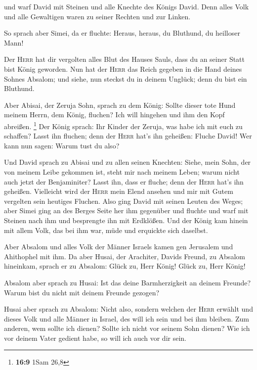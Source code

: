  und warf David mit Steinen und alle Knechte des Königs
David. Denn alles Volk und alle Gewaltigen waren zu seiner Rechten und
zur Linken.

 So sprach aber Simei, da er fluchte: Heraus, heraus, du
Bluthund, du heilloser Mann!

 Der \textsc{Herr} hat dir vergolten alles Blut des Hauses
Sauls, dass du an seiner Statt bist König geworden. Nun hat der
\textsc{Herr} das Reich gegeben in die Hand deines Sohnes Absalom; und
siehe, nun steckst du in deinem Unglück; denn du bist ein Bluthund.

 Aber Abisai, der Zeruja Sohn, sprach zu dem König: Sollte
dieser tote Hund meinem Herrn, dem König, fluchen? Ich will hingehen und
ihm den Kopf abreißen. \footnote{\textbf{16:9} 1Sam 26,8}
 Der König sprach: Ihr Kinder der Zeruja, was habe ich
mit euch zu schaffen? Lasst ihn fluchen; denn der \textsc{Herr} hat's
ihn geheißen: Fluche David! Wer kann nun sagen: Warum tust du also?

 Und David sprach zu Abisai und zu allen seinen Knechten:
Siehe, mein Sohn, der von meinem Leibe gekommen ist, steht mir nach
meinem Leben; warum nicht auch jetzt der Benjaminiter? Lasst ihn, dass
er fluche; denn der \textsc{Herr} hat's ihn geheißen. 
Vielleicht wird der \textsc{Herr} mein Elend ansehen und mir mit Gutem
vergelten sein heutiges Fluchen.  Also ging David mit
seinen Leuten des Weges; aber Simei ging an des Berges Seite her ihm
gegenüber und fluchte und warf mit Steinen nach ihm und besprengte ihn
mit Erdklößen.  Und der König kam hinein mit allem Volk,
das bei ihm war, müde und erquickte sich daselbst.

 Aber Absalom und alles Volk der Männer Israels kamen gen
Jerusalem und Ahithophel mit ihm.  Da aber Husai, der
Arachiter, Davids Freund, zu Absalom hineinkam, sprach er zu Absalom:
Glück zu, Herr König! Glück zu, Herr König!

 Absalom aber sprach zu Husai: Ist das deine
Barmherzigkeit an deinem Freunde? Warum bist du nicht mit deinem Freunde
gezogen?

 Husai aber sprach zu Absalom: Nicht also, sondern
welchen der \textsc{Herr} erwählt und dieses Volk und alle Männer in
Israel, des will ich sein und bei ihm bleiben.  Zum
anderen, wem sollte ich dienen? Sollte ich nicht vor seinem Sohn dienen?
Wie ich vor deinem Vater gedient habe, so will ich auch vor dir sein.

